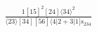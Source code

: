 \documentclass[varwidth, border=5pt]{standalone}
\begin{document}
\begin{my}
$\begin{gathered}
\scriptscriptstyle\frac{1[15]^2[24]⟨34⟩^2}{⟨23⟩[34][56]⟨4|2+3|1]s_{234}}
\end{gathered}$
\end{my}
\end{document}
